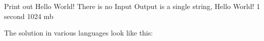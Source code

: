 \documentclass[12pt]{article}
\begin{document}
{Print out Hello World!}
{There is no Input}
{Output is a single string, Hello World!}
{1 second}
{1024 mb}
{}

\hrulefill

The solution in various languages look like this:

\end{document}
